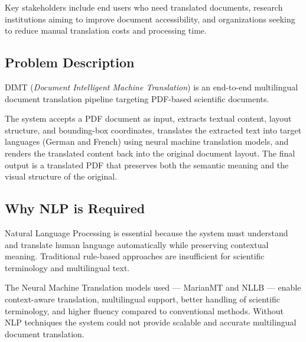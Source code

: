 \documentclass[12pt,a4paper]{article}
\begin{document}
Key stakeholders include end users who need translated documents, research institutions aiming to improve document accessibility, and organizations seeking to reduce manual translation costs and processing time.

\subsection{Problem Description}

DIMT (\emph{Document Intelligent Machine Translation}) is an end-to-end multilingual document translation pipeline targeting PDF-based scientific documents.

The system accepts a PDF document as input, extracts textual content, layout structure, and bounding-box coordinates, translates the extracted text into target languages (German and French) using neural machine translation models, and renders the translated content back into the original document layout. The final output is a translated PDF that preserves both the semantic meaning and the visual structure of the original.

\subsection{Why NLP is Required}

Natural Language Processing is essential because the system must understand and translate human language automatically while preserving contextual meaning. Traditional rule-based approaches are insufficient for scientific terminology and multilingual text.

The Neural Machine Translation models used — MarianMT and NLLB — enable context-aware translation, multilingual support, better handling of scientific terminology, and higher fluency compared to conventional methods. Without NLP techniques the system could not provide scalable and accurate multilingual document translation.
\end{document}
